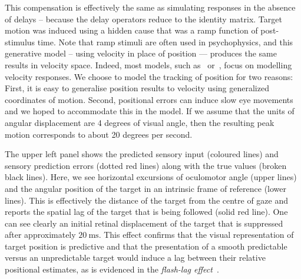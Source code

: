 \documentclass[a4paper]{article} %
\newcommand{\ms}{\si{\milli\second}}%
\begin{document}
This compensation is effectively the same as simulating responses in the
absence of delays -- because the delay operators reduce to the identity
matrix. Target motion was induced using a hidden cause that was a ramp
function of post-stimulus time. Note that ramp stimuli are often used in
psychophysics, and this generative model -- using velocity in place of
position --- produces the same results in velocity space. Indeed, most
models, such as~\citep{Robinson86} or~\citep{Krauzlis89},
focus on modelling velocity responses. We choose to model the tracking
of position for two reasons: First, it is easy to generalise position
results to velocity using generalized coordinates of motion. Second,
positional errors can induce slow eye movements~\citep{Kowler79,Wyatt81} and we hoped to accommodate this in the
model. If we assume that the units of angular displacement are 4 degrees of visual angle, then
the resulting peak motion corresponds to about 20 degrees per second.

The upper left panel shows the predicted sensory input (coloured lines)
and sensory prediction errors (dotted red lines) along with the true
values (broken black lines). Here, we see horizontal excursions of
oculomotor angle (upper lines) and the angular position of the target in
an intrinsic frame of reference (lower lines). This is effectively the
distance of the target from the centre of gaze and reports the spatial
lag of the target that is being followed (solid red line). One can see
clearly an initial retinal displacement of the target that is suppressed
after approximately $20~\ms $. This effect confirms that the visual representation of target position is predictive
and that the presentation of a smooth predictable versus an
unpredictable target would induce a lag between their relative
positional estimates, as is evidenced in the \emph{flash-lag
effect}~\citep{Nijhawan94}.
\end{document}
